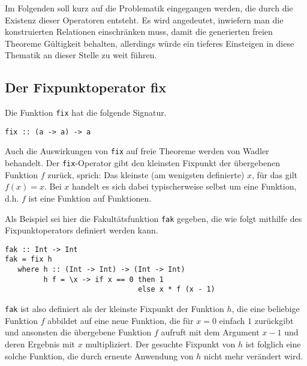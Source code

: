 
Im Folgenden soll kurz auf die Problematik eingegangen werden, die durch die Existenz dieser Operatoren entsteht. Es wird
angedeutet, inwiefern man die konstruierten Relationen einschränken muss, damit die generierten freien Theoreme Gültigkeit
behalten, allerdings würde ein tieferes Einsteigen in diese Thematik an dieser Stelle zu weit führen.


\subsection{Der Fixpunktoperator fix}

Die Funktion \texttt{fix} hat die folgende Signatur.

\begin{verbatim}
fix :: (a -> a) -> a
\end{verbatim}

Auch die Auswirkungen von \texttt{fix} auf freie Theoreme werden von Wadler \cite{wadler} behandelt.
Der \texttt{fix}-Operator gibt den kleinsten Fixpunkt der übergebenen Funktion $f$
zurück, sprich: Das kleinste (am wenigsten definierte) $x$, für das gilt $f(x) = x$. Bei $x$ handelt es sich dabei
typischerweise selbst um eine Funktion, d.h. $f$ ist eine Funktion auf Funktionen.

Als Beispiel sei hier die Fakultätsfunktion \texttt{fak} gegeben, die wie folgt mithilfe des Fixpunktoperators definiert werden
kann.

\begin{verbatim}
fak :: Int -> Int
fak = fix h
   where h :: (Int -> Int) -> (Int -> Int)
         h f = \x -> if x == 0 then 1
                               else x * f (x - 1)
\end{verbatim}

\texttt{fak} ist also definiert als der kleinste Fixpunkt der Funktion $h$, die eine beliebige Funktion $f$ abbildet auf
eine neue Funktion, die für $x = 0$ einfach $1$ zurückgibt und ansonsten die übergebene Funktion $f$ aufruft mit dem
Argument $x - 1$ und deren Ergebnis mit $x$ multipliziert.
Der gesuchte Fixpunkt von $h$ ist folglich eine solche Funktion, die durch erneute Anwendung von $h$ nicht mehr
verändert wird.

